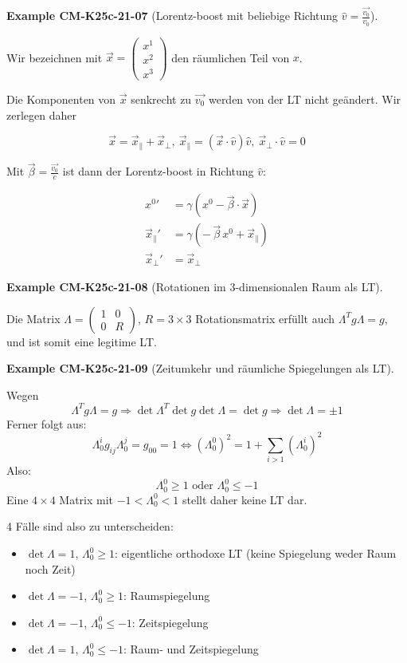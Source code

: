 \documentclass[10pt, letterpaper]{article}
\newcommand{\CustomHeading}[3]{%
  \par\medskip\noindent%
  \textbf{#1 #2} \textnormal{(#3)}.\enskip%
}
\newenvironment{EXA}[2]{\CustomHeading{Example}{#1}{#2}}{}
\begin{document}
\begin{EXA}{CM-K25c-21-07}{Lorentz-boost mit beliebige Richtung $\hat{v}=\frac{\vec{v_0}}{v_0}$}
Wir bezeichnen mit $\vec{x}=\begin{pmatrix} x^1 \\ x^2 \\ x^3 \end{pmatrix}$ den räumlichen Teil von $x$.

Die Komponenten von $\vec{x}$ senkrecht zu $\vec{v_0}$ werden von der LT nicht geändert. Wir zerlegen daher

$$\vec{x}=\vec{x}_\parallel + \vec{x}_\perp,\ \vec{x}_\parallel = (\vec{x}\cdot\hat{v})\hat{v},\ \vec{x}_\perp \cdot \hat{v} = 0$$

Mit $\vec{\beta}=\frac{\vec{v_0}}{c}$ ist dann der Lorentz-boost in Richtung $\hat{v}$:

\[
\boxed{
\begin{aligned}
{x^0}'             &= \gamma\!\left(x^0 - \vec{\beta}\cdot\vec{x}\right)\\
\vec{x}_{\parallel}' &= \gamma\!\left(-\,\vec{\beta}\,x^0 + \vec{x}_{\parallel}\right)\\
\vec{x}_{\perp}'     &= \vec{x}_{\perp}
\end{aligned}}
\]
\end{EXA}

\begin{EXA}{CM-K25c-21-08}{Rotationen im 3-dimensionalen Raum als LT}
Die Matrix $\Lambda=\begin{pmatrix} 1 & 0 \\ 0 & R \end{pmatrix}$, $R=3\times3$ Rotationsmatrix erfüllt auch $\Lambda^T g \Lambda = g$, und ist somit eine legitime LT.
\end{EXA}

\begin{EXA}{CM-K25c-21-09}{Zeitumkehr und räumliche Spiegelungen als LT}
Wegen 
$$\Lambda^T g \Lambda = g \Rightarrow \det\Lambda^T \det g \det \Lambda = \det g
\Rightarrow \det \Lambda = \pm 1$$
Ferner folgt aus:
$$\Lambda^i_0 g_{ij} \Lambda^j_0 = g_{00} = 1 \Leftrightarrow (\Lambda^0_0)^2 = 1+ \sum_{i>1} (\Lambda^i_0)^2$$
Also: 
$$\Lambda^0_0 \geq 1 \text{ oder } \Lambda^0_0 \leq -1$$
Eine $4\times4$ Matrix mit $-1 < \Lambda^0_0 < 1$ stellt daher keine LT dar.

4 Fälle sind also zu unterscheiden:
\begin{itemize}
\item $\det \Lambda = 1$, $\Lambda^0_0 \geq 1$: eigentliche orthodoxe LT (keine Spiegelung weder Raum noch Zeit)
\item $\det \Lambda = -1$, $\Lambda^0_0 \geq 1$: Raumspiegelung
\item $\det \Lambda = -1$, $\Lambda^0_0 \leq -1$: Zeitspiegelung
\item $\det \Lambda = 1$, $\Lambda^0_0 \leq -1$: Raum- und Zeitspiegelung
\end{itemize}
\end{EXA}
\end{document}
